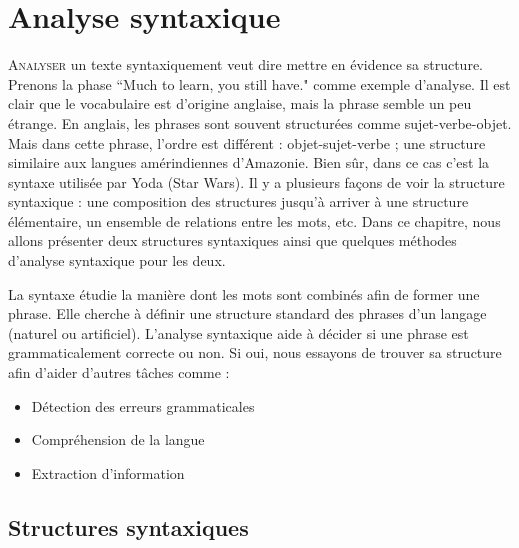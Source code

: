 \documentclass{KodeBook}
\begin{document}
		\mainmatter
	
\fi
\chapter{Analyse syntaxique}

\begin{introduction}
	\lettrine{A}{nalyser} un texte syntaxiquement veut dire mettre en évidence sa structure.
	Prenons la phase ``Much to learn, you still have." comme exemple d'analyse.
	Il est clair que le vocabulaire est d'origine anglaise, mais la phrase semble un peu étrange. 
	En anglais, les phrases sont souvent structurées comme sujet-verbe-objet. 
	Mais dans cette phrase, l'ordre est différent : objet-sujet-verbe ; une structure similaire aux langues amérindiennes d'Amazonie. 
	Bien sûr, dans ce cas c'est la syntaxe utilisée par Yoda (Star Wars).
	Il y a plusieurs façons de voir la structure syntaxique : une composition des structures jusqu'à arriver à une structure élémentaire, un ensemble de relations entre les mots, etc. 
	Dans ce chapitre, nous allons présenter deux structures syntaxiques ainsi que quelques méthodes d'analyse syntaxique pour les deux.
\end{introduction} 


La syntaxe étudie la manière dont les mots sont combinés afin de former une phrase.
Elle cherche à définir une structure standard des phrases d'un langage (naturel ou artificiel).
L'analyse syntaxique aide à décider si une phrase est grammaticalement correcte ou non. 
Si oui, nous essayons de trouver sa structure afin d'aider d'autres tâches comme :
\begin{itemize}
	\item Détection des erreurs grammaticales 
	\item Compréhension de la langue
	\item Extraction d'information 
\end{itemize}

\section{Structures syntaxiques}
\end{document}
